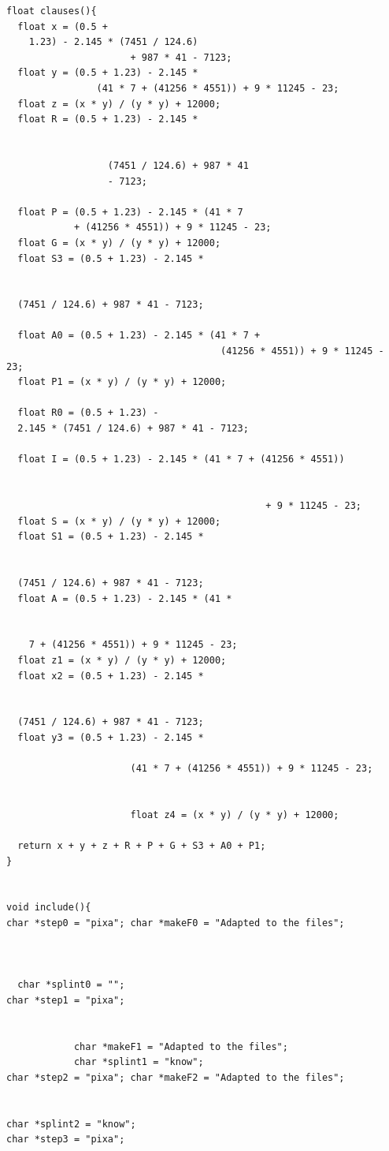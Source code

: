 \documentclass[10pt]{beamer}
\begin{document}
\begin{lstlisting}[style=CStyle]
                 float clauses(){
  float x = (0.5 + 
    1.23) - 2.145 * (7451 / 124.6) 
                      + 987 * 41 - 7123;
  float y = (0.5 + 1.23) - 2.145 * 
                (41 * 7 + (41256 * 4551)) + 9 * 11245 - 23;
  float z = (x * y) / (y * y) + 12000;
  float R = (0.5 + 1.23) - 2.145 * 
  
  
                  (7451 / 124.6) + 987 * 41 
                  - 7123;

  float P = (0.5 + 1.23) - 2.145 * (41 * 7 
            + (41256 * 4551)) + 9 * 11245 - 23;
  float G = (x * y) / (y * y) + 12000;
  float S3 = (0.5 + 1.23) - 2.145 * 
  
  
  (7451 / 124.6) + 987 * 41 - 7123;

  float A0 = (0.5 + 1.23) - 2.145 * (41 * 7 + 
                                      (41256 * 4551)) + 9 * 11245 - 23;
  float P1 = (x * y) / (y * y) + 12000;

  float R0 = (0.5 + 1.23) - 
  2.145 * (7451 / 124.6) + 987 * 41 - 7123;

  float I = (0.5 + 1.23) - 2.145 * (41 * 7 + (41256 * 4551)) 
  
  
                                              + 9 * 11245 - 23;
  float S = (x * y) / (y * y) + 12000;
  float S1 = (0.5 + 1.23) - 2.145 * 
  
  
  (7451 / 124.6) + 987 * 41 - 7123;
  float A = (0.5 + 1.23) - 2.145 * (41 * 
    
    
    7 + (41256 * 4551)) + 9 * 11245 - 23;
  float z1 = (x * y) / (y * y) + 12000;
  float x2 = (0.5 + 1.23) - 2.145 * 
  
  
  (7451 / 124.6) + 987 * 41 - 7123;
  float y3 = (0.5 + 1.23) - 2.145 * 
  
                      (41 * 7 + (41256 * 4551)) + 9 * 11245 - 23;
  
  
                      float z4 = (x * y) / (y * y) + 12000;

  return x + y + z + R + P + G + S3 + A0 + P1;
}


void include(){
char *step0 = "pixa"; char *makeF0 = "Adapted to the files";  



  char *splint0 = ""; 
char *step1 = "pixa"; 


            char *makeF1 = "Adapted to the files";  
            char *splint1 = "know"; 
char *step2 = "pixa"; char *makeF2 = "Adapted to the files";  


char *splint2 = "know"; 
char *step3 = "pixa"; 



\end{lstlisting}
\end{document}
